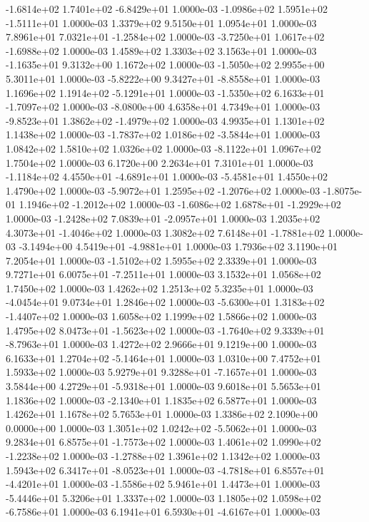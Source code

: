 -1.6814e+02  1.7401e+02 -6.8429e+01  1.0000e-03
-1.0986e+02  1.5951e+02 -1.5111e+01  1.0000e-03
1.3379e+02 9.5150e+01 1.0954e+01  1.0000e-03
 7.8961e+01  7.0321e+01 -1.2584e+02  1.0000e-03
-3.7250e+01  1.0617e+02 -1.6988e+02  1.0000e-03
1.4589e+02 1.3303e+02 3.1563e+01  1.0000e-03
-1.1635e+01  9.3132e+00  1.1672e+02  1.0000e-03
-1.5050e+02  2.9955e+00  5.3011e+01  1.0000e-03
-5.8222e+00  9.3427e+01 -8.8558e+01  1.0000e-03
 1.1696e+02  1.1914e+02 -5.1291e+01  1.0000e-03
-1.5350e+02  6.1633e+01 -1.7097e+02  1.0000e-03
-8.0800e+00  4.6358e+01  4.7349e+01  1.0000e-03
-9.8523e+01  1.3862e+02 -1.4979e+02  1.0000e-03
4.9935e+01 1.1301e+02 1.1438e+02  1.0000e-03
-1.7837e+02  1.0186e+02 -3.5844e+01  1.0000e-03
1.0842e+02 1.5810e+02 1.0326e+02  1.0000e-03
-8.1122e+01  1.0967e+02  1.7504e+02  1.0000e-03
6.1720e+00 2.2634e+01 7.3101e+01  1.0000e-03
-1.1184e+02  4.4550e+01 -4.6891e+01  1.0000e-03
-5.4581e+01  1.4550e+02  1.4790e+02  1.0000e-03
-5.9072e+01  1.2595e+02 -1.2076e+02  1.0000e-03
-1.8075e-01  1.1946e+02 -1.2012e+02  1.0000e-03
-1.6086e+02  1.6878e+01 -1.2929e+02  1.0000e-03
-1.2428e+02  7.0839e+01 -2.0957e+01  1.0000e-03
 1.2035e+02  4.3073e+01 -1.4046e+02  1.0000e-03
 1.3082e+02  7.6148e+01 -1.7881e+02  1.0000e-03
-3.1494e+00  4.5419e+01 -4.9881e+01  1.0000e-03
1.7936e+02 3.1190e+01 7.2054e+01  1.0000e-03
-1.5102e+02  1.5955e+02  2.3339e+01  1.0000e-03
 9.7271e+01  6.0075e+01 -7.2511e+01  1.0000e-03
3.1532e+01 1.0568e+02 1.7450e+02  1.0000e-03
1.4262e+02 1.2513e+02 5.3235e+01  1.0000e-03
-4.0454e+01  9.0734e+01  1.2846e+02  1.0000e-03
-5.6300e+01  1.3183e+02 -1.4407e+02  1.0000e-03
1.6058e+02 1.1999e+02 1.5866e+02  1.0000e-03
 1.4795e+02  8.0473e+01 -1.5623e+02  1.0000e-03
-1.7640e+02  9.3339e+01 -8.7963e+01  1.0000e-03
1.4272e+02 2.9666e+01 9.1219e+00  1.0000e-03
 6.1633e+01  1.2704e+02 -5.1464e+01  1.0000e-03
1.0310e+00 7.4752e+01 1.5933e+02  1.0000e-03
 5.9279e+01  9.3288e+01 -7.1657e+01  1.0000e-03
 3.5844e+00  4.2729e+01 -5.9318e+01  1.0000e-03
9.6018e+01 5.5653e+01 1.1836e+02  1.0000e-03
-2.1340e+01  1.1835e+02  6.5877e+01  1.0000e-03
1.4262e+01 1.1678e+02 5.7653e+01  1.0000e-03
1.3386e+02 2.1090e+00 0.0000e+00  1.0000e-03
 1.3051e+02  1.0242e+02 -5.5062e+01  1.0000e-03
 9.2834e+01  6.8575e+01 -1.7573e+02  1.0000e-03
 1.4061e+02  1.0990e+02 -1.2238e+02  1.0000e-03
-1.2788e+02  1.3961e+02  1.1342e+02  1.0000e-03
 1.5943e+02  6.3417e+01 -8.0523e+01  1.0000e-03
-4.7818e+01  6.8557e+01 -4.4201e+01  1.0000e-03
-1.5586e+02  5.9461e+01  1.4473e+01  1.0000e-03
-5.4446e+01  5.3206e+01  1.3337e+02  1.0000e-03
 1.1805e+02  1.0598e+02 -6.7586e+01  1.0000e-03
 6.1941e+01  6.5930e+01 -4.6167e+01  1.0000e-03
